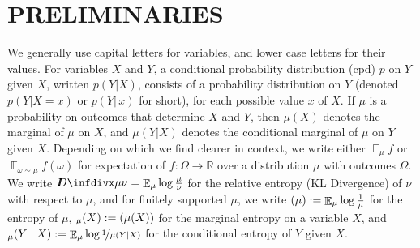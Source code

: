 \documentclass[twoside]{article}
\theoremstyle{plain}
\theoremstyle{definition}
\let\H\relax
\DeclareMathOperator{\H}{\mathrm{H}} %
\DeclareMathOperator*{\Ex}{\mathbb{E}} %
\newcommand{\thickD}{I\mkern-8muD}
\newcommand{\kldiv}{\thickD\infdivx}
\begin{document}
%


\section{PRELIMINARIES}
We generally use capital letters for variables, and lower case letters for their values.
For variables $X$ and $Y$, a conditional probability distribution (cpd) $p$ on $Y$ given $X$, written $p(Y|X)$, consists of a probability distribution on $Y$ (denoted $p(Y| X\!=\!x)$ or $p(Y|\,x)$ for short), for each possible value $x$ of $X$.
If $\mu$ is a probability on outcomes that determine $X$ and $Y$,
then $\mu(X)$ denotes the marginal of $\mu$ on $X$, and $\mu(Y|X)$
denotes the conditional marginal of $\mu$ on  $Y$ given $X$.
Depending on which we find clearer in context, we write either $\Ex_\mu f$ or $\Ex_{\omega \sim \mu} f(\omega)$ for expectation of $f : \Omega \to \mathbb R$ over a distribution $\mu$ with outcomes $\Omega$.
We write $\kldiv\mu\nu = \Ex_\mu \log \frac{\mu}{\nu}$ for the relative entropy (KL Divergence) of $\nu$ with respect to $\mu$,
and for finitely supported $\mu$,
we write $\H(\mu) := \Ex_\mu \log\frac1\mu$ for the entropy of $\mu$, $\H_\mu(X):= \H(\mu(X))$ for the marginal entropy on a variable $X$, and $\H_\mu(Y \mid X):= \Ex_\mu \log \nicefrac1{\mu(Y|X)}$ for the conditional entropy of $Y$ given $X$.
\end{document}
